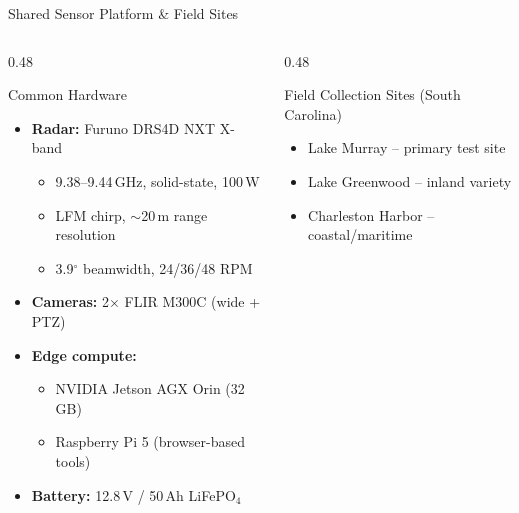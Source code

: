\documentclass[aspectratio=169, 10pt]{beamer}
\begin{document}
\begin{frame}{Shared Sensor Platform \& Field Sites}
  \begin{columns}[T]
    \begin{column}{0.48\textwidth}
      \begin{block}{Common Hardware}
        {\small
        \begin{itemize}\setlength{\itemsep}{0pt}
          \item \textbf{Radar:} Furuno DRS4D NXT X-band
            \begin{itemize}
              \item[$\circ$] 9.38--9.44\,GHz, solid-state, 100\,W
              \item[$\circ$] LFM chirp, $\sim$20\,m range resolution
              \item[$\circ$] 3.9$^\circ$ beamwidth, 24/36/48 RPM
            \end{itemize}
          \item \textbf{Cameras:} 2$\times$ FLIR M300C (wide + PTZ)
          \item \textbf{Edge compute:}
            \begin{itemize}
              \item[$\circ$] NVIDIA Jetson AGX Orin (32\,GB)
              \item[$\circ$] Raspberry Pi 5 (browser-based tools)
            \end{itemize}
          \item \textbf{Battery:} 12.8\,V / 50\,Ah LiFePO$_4$
        \end{itemize}
        }
      \end{block}
    \end{column}
    \begin{column}{0.48\textwidth}
      \begin{block}{Field Collection Sites (South Carolina)}
        {\small
        \begin{itemize}\setlength{\itemsep}{0pt}
          \item Lake Murray -- primary test site
          \item Lake Greenwood -- inland variety
          \item Charleston Harbor -- coastal/maritime
        \end{itemize}
        \vspace{0.2em}
}
\end{block}
\end{column}
\end{columns}
\end{frame}
\end{document}
